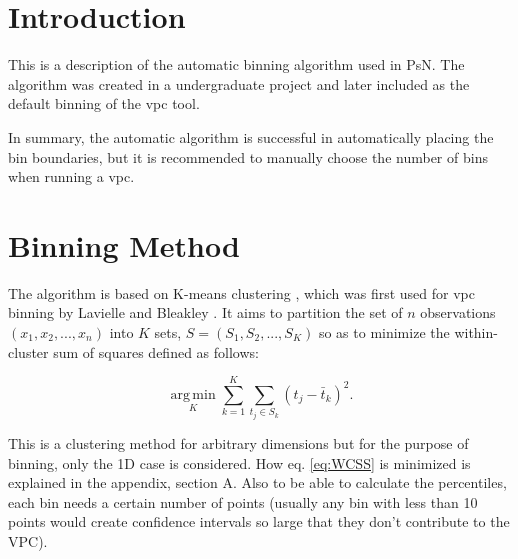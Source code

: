 

\usepackage{algorithm}
\usepackage{algorithmic}
\usepackage{graphicx}
\usepackage{epstopdf}
\usepackage{subfigure}
\usepackage[utf8]{inputenc}
\usepackage{amssymb,amsmath} 
\usepackage{color}
\usepackage{soul}
\usepackage[normalem]{ulem}
\newcommand{\hilight}[1]{\colorbox{yellow}{#1}}
\usepackage{hyperref}




\maketitle
\tableofcontents
\newpage

\section{Introduction}
This is a description of the automatic binning algorithm used in PsN. The algorithm was created in a undergraduate project \cite{Sonehag} and later included as the default binning of the vpc tool.

In summary, the automatic algorithm is successful in automatically placing the bin boundaries, but it is recommended to manually choose the number of bins when running a vpc.

\section{Binning Method}
The algorithm is based on K-means clustering \cite{KMeans}, which was first used for vpc binning by Lavielle and Bleakley \cite{Lavielle}.
It aims to partition the set of $n$ observations $(x_1, x_2, ..., x_n)$ into $K$ sets, $S=(S_1, S_2, ..., S_K)$ so as to minimize the within-cluster sum of squares defined as follows: 

\begin{equation}
	  \underset{K}{\operatorname{arg\,min}} \sum_{k=1}^{K} \sum_{t_j \in S_k} (t_j - \bar{t}_k )^2.
	  \label{eq:WCSS} 
\end{equation}

This is a clustering method for arbitrary dimensions but for the purpose of binning, only the 1D case is considered. How eq. \ref{eq:WCSS} is minimized is explained in the appendix, section A. Also to be able to calculate the percentiles, each bin needs a certain number of points (usually any bin with less than 10 points would create confidence intervals so large that they don't contribute to the VPC).

